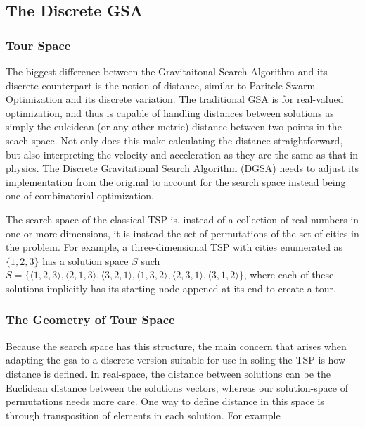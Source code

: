 \documentclass{article}
\begin{document}
\clearpage
\newpage

    \subsection{The Discrete GSA}

        \subsubsection{Tour Space}

            The biggest difference between the Gravitaitonal Search Algorithm and its discrete counterpart is the notion of distance, similar to Paritcle Swarm Optimization and its discrete variation.  The traditional GSA is for real-valued optimization, and thus is capable of handling distances between solutions as simply the eulcidean (or any other metric) distance between two points in the seach space.  Not only does this make calculating the distance straightforward, but also interpreting the velocity and acceleration as they are the same as that in physics.  The Discrete Gravitational Search Algorithm (DGSA) needs to adjust its implementation from the original to account for the search space instead being one of combinatorial optimization.

            The search space of the classical TSP is, instead of a collection of real numbers in one or more dimensions, it is instead the set of permutations of the set of cities in the problem.  For example, a three-dimensional TSP with cities enumerated as $\{1,2,3\}$ has a solution space $S$ such $S = \{\langle 1,2,3 \rangle, \langle 2,1,3 \rangle, \langle 3,2,1 \rangle, \langle 1,3,2 \rangle, \langle 2,3,1\rangle, \langle 3,1,2 \rangle\}$, where each of these solutions implicitly has its starting node appened at its end to create a tour. %


        \subsubsection{The Geometry of Tour Space}

            Because the search space has this structure, the main concern that arises when adapting the gsa to a discrete version suitable for use in soling the TSP is how distance is defined.  In real-space, the distance between solutions can be the Euclidean distance between the solutions vectors, whereas our solution-space of permutations needs more care.  One way to define distance in this space is through transposition of elements in each solution.  For example
\end{document}
